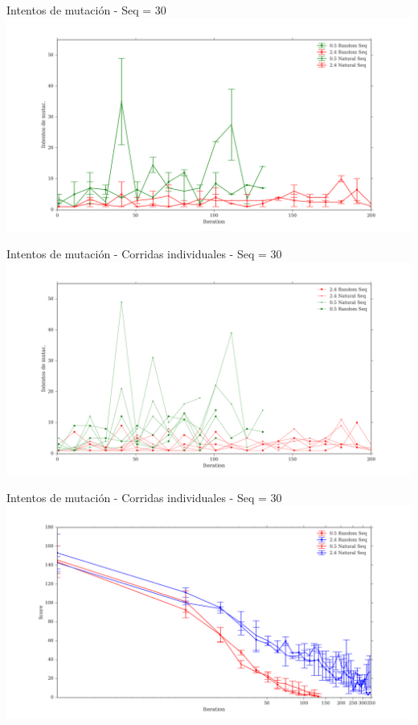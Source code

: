 \documentclass{beamer}
\begin{document}
\begin{frame}{Intentos de mutación - Seq = 30}
\includegraphics[width=\textwidth,height=0.85\textheight]{mutAttempts.png}
\end{frame}

\begin{frame}{Intentos de mutación - Corridas individuales - Seq = 30}
\includegraphics[width=\textwidth,height=0.85\textheight]{mutAttemptsRuns.png}
\end{frame}

\begin{frame}{Intentos de mutación - Corridas individuales - Seq = 30}
\includegraphics[width=\textwidth,height=0.85\textheight]{scoreVsIterMean.png}
\end{frame}
\end{document}
